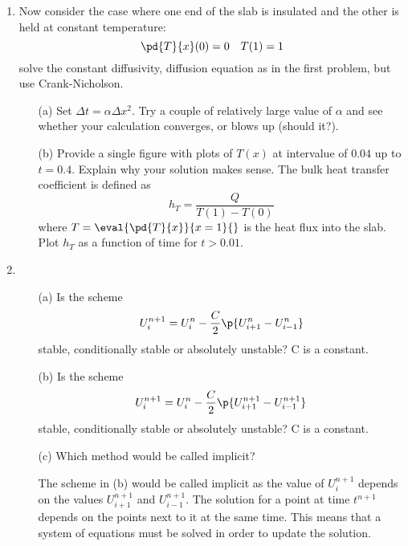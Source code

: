 \documentclass[11pt, oneside]{article}
\begin{document}
\begin{enumerate}
  \item %
    Now consider the case where one end of the slab is insulated and the other
    is held at constant temperature:
    \[
      \pd{T}{x}(0) = 0 \quad T(1) = 1
    \]
    solve the constant diffusivity, diffusion equation as in the first problem,
    but use Crank-Nicholson.
    \begin{enumerate}
      \item[(a)]
        Set $\Delta t = \alpha \Delta x^2$.
        Try a couple of relatively large value of $\alpha$ and see whether your
        calculation converges, or blows up (should it?).

      \item[(b)]
        Provide a single figure with plots of $T(x)$ at intervalue of $0.04$ up to $t = 0.4$.
        Explain why your solution makes sense.
        The bulk heat transfer coefficient is defined as
        \[
          h_T = \frac{Q}{T(1) - T(0)}
        \]
        where $T = \eval{\pd{T}{x}}{x = 1}{}$ is the heat flux into the slab.
        Plot $h_T$ as a function of time for $t > 0.01$.
    \end{enumerate}

  \item %
    \begin{enumerate}
      \item[(a)]
        Is the scheme
        \[
          U_i^{n+1} = U_i^n - \frac{C}{2} \p{U_{i+1}^n - U_{i-1}^n}
        \]
        stable, conditionally stable or absolutely unstable?
        C is a constant.

      \item[(b)]
        Is the scheme
        \[
          U_i^{n+1} = U_i^n - \frac{C}{2} \p{U_{i+1}^{n+1} - U_{i-1}^{n+1}}
        \]
        stable, conditionally stable or absolutely unstable?
        C is a constant.

      \item[(c)] %
        Which method would be called implicit?

        The scheme in (b) would be called implicit as the value of $U^{n+1}_i$
        depends on the values $U^{n+1}_{i+1}$ and $U^{n+1}_{i-1}$.
        The solution for a point at time $t^{n+1}$ depends on the points next
        to it at the same time.
        This means that a system of equations must be solved in order to update
        the solution.
    \end{enumerate}
\end{enumerate}
\end{document}
